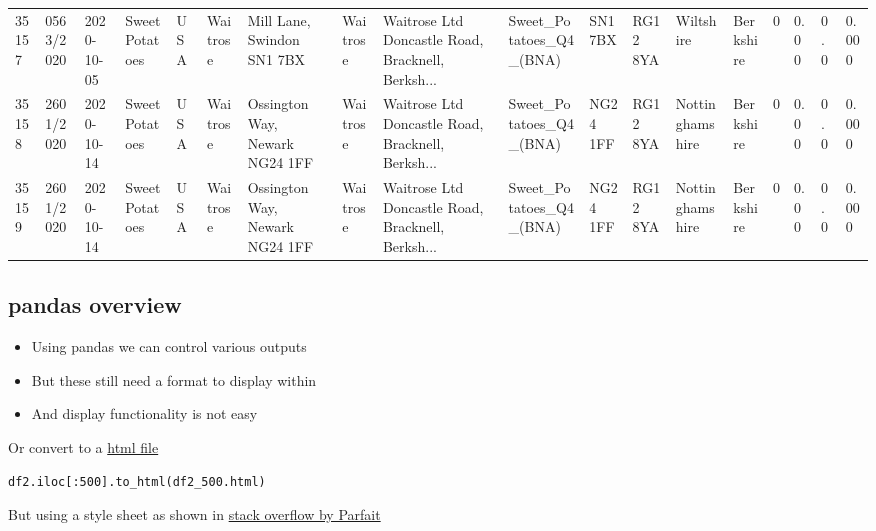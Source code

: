 \documentclass[
  letterpaper,
  DIV=11,
  numbers=noendperiod]{scrartcl}
\providecommand{\tightlist}{%
  \setlength{\itemsep}{0pt}\setlength{\parskip}{0pt}}\usepackage{longtable,booktabs,array}
\begin{document}
\begin{longtable}[]{@{}llllllllllllllllll@{}}
35157 & 0563/2020 & 2020-10-05 & Sweet Potatoes & USA & Waitrose & Mill
Lane, Swindon SN1 7BX & Waitrose & Waitrose Ltd Doncastle Road,
Bracknell, Berksh... & Sweet\_Potatoes\_Q4\_(BNA) & SN1 7BX & RG12 8YA &
Wiltshire & Berkshire & 0 & 0.00 & 0.0 & 0.000 \\
35158 & 2601/2020 & 2020-10-14 & Sweet Potatoes & USA & Waitrose &
Ossington Way, Newark NG24 1FF & Waitrose & Waitrose Ltd Doncastle Road,
Bracknell, Berksh... & Sweet\_Potatoes\_Q4\_(BNA) & NG24 1FF & RG12 8YA
& Nottinghamshire & Berkshire & 0 & 0.00 & 0.0 & 0.000 \\
35159 & 2601/2020 & 2020-10-14 & Sweet Potatoes & USA & Waitrose &
Ossington Way, Newark NG24 1FF & Waitrose & Waitrose Ltd Doncastle Road,
Bracknell, Berksh... & Sweet\_Potatoes\_Q4\_(BNA) & NG24 1FF & RG12 8YA
& Nottinghamshire & Berkshire & 0 & 0.00 & 0.0 & 0.000 \\
\bottomrule()
\end{longtable}

\hypertarget{pandas-overview}{%
\subsection{pandas overview}\label{pandas-overview}}

\begin{itemize}
\tightlist
\item
  Using pandas we can control various outputs
\item
  But these still need a format to display within
\item
  And display functionality is not easy
\end{itemize}

Or convert to a
\href{file:///C:/Users/44781/Documents/GitHub/jupyter_present/df2_500.html}{html
file}

\texttt{df2.iloc{[}:500{]}.to\_html(\textquotesingle{}df2\_500.html\textquotesingle{})}

But using a style sheet as shown in
\href{https://stackoverflow.com/questions/50807744/apply-css-class-to-pandas-dataframe-using-to-html}{stack
overflow by Parfait}
\end{document}
